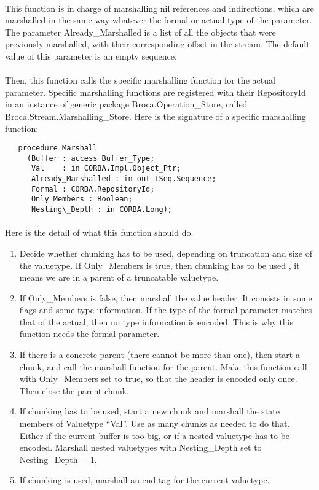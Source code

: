 \paragraph{}This function is in charge of marshalling nil references and
indirections, which are marshalled in the same way whatever the formal
or actual type of the parameter. The parameter Already\_Marshalled
is a list of all the objects that were previously marshalled, with their
corresponding offset in the stream. The default value of this
parameter is an empty sequence.

\paragraph{}Then, this function calls the specific marshalling
function for the actual parameter. Specific marshalling functions are
registered with their RepositoryId in an instance of generic package
Broca.Operation\_Store, called Broca.Stream.Marshalling\_Store.
Here is the signature of a specific
marshalling function:

\begin{verbatim}
   procedure Marshall
     (Buffer : access Buffer_Type;
      Val    : in CORBA.Impl.Object_Ptr;
      Already_Marshalled : in out ISeq.Sequence;
      Formal : CORBA.RepositoryId;
      Only_Members : Boolean;
      Nesting\_Depth : in CORBA.Long);
\end{verbatim}

\paragraph{}Here is the detail of what this function should do.
\begin{enumerate}
\item Decide whether chunking has to be used, depending on truncation
     and size of the valuetype. If Only\_Members is true, then chunking has to
     be used , it means we are in a parent of a truncatable valuetype.
\item If Only\_Members is false, then marshall the value header. It
     consists in some flags and some type information. If the type of
     the formal parameter matches that of the actual, then no type
     information is encoded. This is why this function needs the
     formal parameter.
\item If there is a concrete parent (there cannot be more than one),
     then start a chunk, and call the marshall function for the
     parent. Make this
     function call with Only\_Members set to true, so that the header
     is encoded only once. Then close the parent chunk.
\item If chunking has to be used, start a new chunk and marshall the
     state members of Valuetype ``Val''. Use as many chunks as needed
     to do that. Either if the current buffer is too big, or if a
     nested valuetype has to be encoded. Marshall nested valuetypes
     with Nesting\_Depth set to Nesting\_Depth + 1.
\item If chunking is used, marshall an end tag for the current valuetype.
\end{enumerate}


